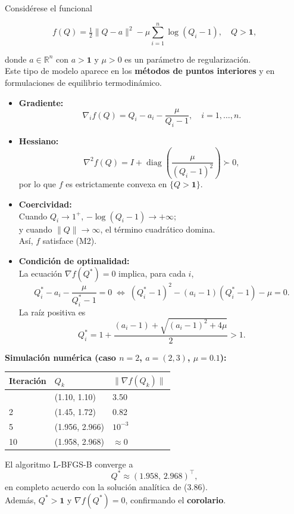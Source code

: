 \documentclass[
  spanish,
  us-letterpaper,
  DIV=11,
  numbers=noendperiod]{scrreprt}
\numberwithin{equation}{section}
\begin{document}
Considérese el funcional

\[
f(Q) = \tfrac{1}{2}\|Q - a\|^2 - \mu \sum_{i=1}^n \log(Q_i - 1),
\quad Q > \mathbf{1}, \tag{3.82}
\]

donde \(a \in \mathbb{R}^n\) con \(a > \mathbf{1}\) y \(\mu > 0\) es un
parámetro de regularización.\\
Este tipo de modelo aparece en los \textbf{métodos de puntos interiores}
y en formulaciones de equilibrio termodinámico.

\begin{itemize}
\item
  \textbf{Gradiente:} \[
  \nabla_i f(Q) = Q_i - a_i - \frac{\mu}{Q_i - 1}, \quad i = 1,\dots,n. \tag{3.83}
  \]
\item
  \textbf{Hessiano:} \[
  \nabla^2 f(Q) = I + \operatorname{diag}\!\left(\frac{\mu}{(Q_i - 1)^2}\right) \succ 0, \tag{3.84}
  \] por lo que \(f\) es estrictamente convexa en
  \(\{Q > \mathbf{1}\}\).
\item
  \textbf{Coercividad:}\\
  Cuando \(Q_i \to 1^+\), \(-\log(Q_i - 1) \to +\infty\);\\
  y cuando \(\|Q\| \to \infty\), el término cuadrático domina.\\
  Así, \(f\) satisface (M2).
\item
  \textbf{Condición de optimalidad:}\\
  La ecuación \(\nabla f(Q^*) = 0\) implica, para cada \(i\), \[
  Q_i^* - a_i - \frac{\mu}{Q_i^* - 1} = 0
  \;\Longleftrightarrow\;
  (Q_i^* - 1)^2 - (a_i - 1)(Q_i^* - 1) - \mu = 0. \tag{3.85}
  \] La raíz positiva es \[
  Q_i^* = 1 + \frac{(a_i - 1) + \sqrt{(a_i - 1)^2 + 4\mu}}{2} > 1. \tag{3.86}
  \]
\end{itemize}

\textbf{Simulación numérica (caso \(n=2\), \(a=(2,3)\), \(\mu=0.1\)):}

\begin{longtable}[]{@{}lll@{}}
\toprule\noalign{}
Iteración & \(Q_k\) & \(\|\nabla f(Q_k)\|\) \\
\midrule\noalign{}
\endhead
\bottomrule\noalign{}
\endlastfoot
0 & (1.10, 1.10) & 3.50 \\
2 & (1.45, 1.72) & 0.82 \\
5 & (1.956, 2.966) & \(10^{-3}\) \\
10 & (1.958, 2.968) & \(\approx 0\) \\
\end{longtable}

El algoritmo L-BFGS-B converge a\\
\[
Q^* \approx (1.958,\,2.968)^\top,
\] en completo acuerdo con la solución analítica de (3.86).\\
Además, \(Q^* > \mathbf{1}\) y \(\nabla f(Q^*) = 0\), confirmando el
\textbf{corolario}.
\end{document}
